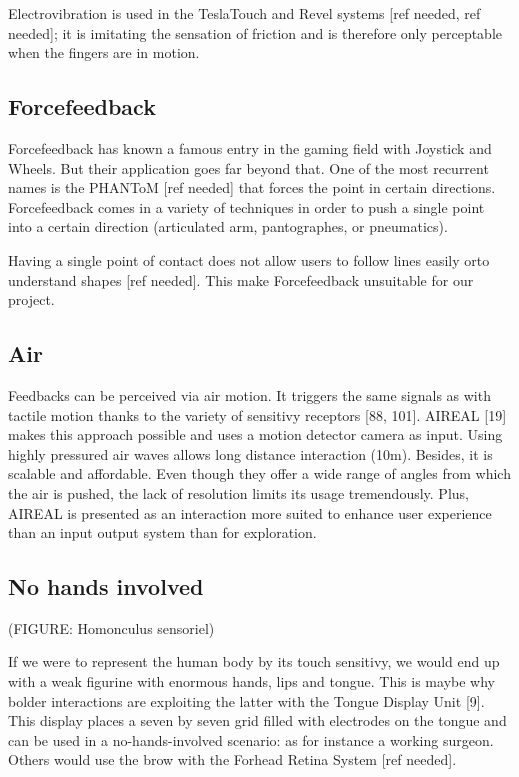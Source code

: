 Electrovibration is used in the TeslaTouch and Revel systems {[}ref
needed, ref needed{]}; it is imitating the sensation of friction and is
therefore only perceptable when the fingers are in motion.

\subsection{Forcefeedback}\label{forcefeedback}

Forcefeedback has known a famous entry in the gaming field with Joystick
and Wheels. But their application goes far beyond that. One of the most
recurrent names is the PHANToM {[}ref needed{]} that forces the point in
certain directions. Forcefeedback comes in a variety of techniques in
order to push a single point into a certain direction (articulated arm,
pantographes, or pneumatics).

Having a single point of contact does not allow users to follow lines
easily orto understand shapes {[}ref needed{]}. This make Forcefeedback
unsuitable for our project.

\subsection{Air}\label{air}

Feedbacks can be perceived via air motion. It triggers the same signals
as with tactile motion thanks to the variety of sensitivy receptors
{[}88, 101{]}. AIREAL {[}19{]} makes this approach possible and uses a
motion detector camera as input. Using highly pressured air waves allows
long distance interaction (10m). Besides, it is scalable and affordable.
Even though they offer a wide range of angles from which the air is
pushed, the lack of resolution limits its usage tremendously. Plus,
AIREAL is presented as an interaction more suited to enhance user
experience than an input output system than for exploration.

\subsection{No hands involved}\label{no-hands-involved}

(FIGURE: Homonculus sensoriel)

If we were to represent the human body by its touch sensitivy, we would
end up with a weak figurine with enormous hands, lips and tongue. This
is maybe why bolder interactions are exploiting the latter with the
Tongue Display Unit {[}9{]}. This display places a seven by seven grid
filled with electrodes on the tongue and can be used in a
no-hands-involved scenario: as for instance a working surgeon. Others
would use the brow with the Forhead Retina System {[}ref needed{]}.

